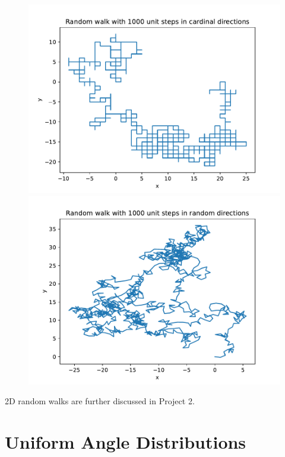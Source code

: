 \documentclass[a4paper,12pt]{article}
\begin{document}
\begin{figure}[!ht]
  \centering
  \begin{minipage}{0.49\textwidth}
    \includegraphics[width=\textwidth]{img/0-grid-1000.pdf}
  \end{minipage}
  \begin{minipage}{0.49\textwidth}
    \includegraphics[width=\textwidth]{img/0-chain-1000.pdf}
  \end{minipage}
\end{figure}

2D random walks are further discussed in Project 2.

\section*{Uniform Angle Distributions}
\end{document}

